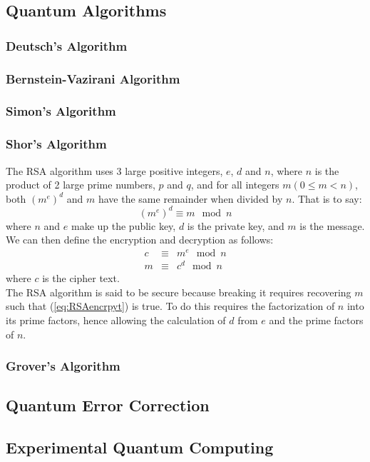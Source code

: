\documentclass{amsart}
\numberwithin{equation}{section}
\begin{document}
\subsection{Quantum Algorithms}
\subsubsection{Deutsch's Algorithm}
\subsubsection{Bernstein-Vazirani Algorithm}
\subsubsection{Simon's Algorithm}
\subsubsection{Shor's Algorithm} \label{sec:ShorsAlgorithm}
\begin{justify}
The RSA algorithm uses 3 large positive integers, $e$, $d$ and $n$, where $n$ is the product of 2 large prime numbers, $p$ and $q$, and for all integers $m(0 \leq m < n)$, both $(m^{e})^{d}$ and $m$ have the same remainder when divided by $n$. That is to say:
    \begin{equation}
        (m^{e})^{d} \equiv m \mod n
    \end{equation}
where $n$ and $e$ make up the public key, $d$ is the private key, and $m$ is the message. We can then define the encryption and decryption as follows: 
    \begin{eqnarray}
        c &\equiv& m^{e} \mod n \label{eq:RSAencrpyt} \\
        m &\equiv& c^{d} \mod n
    \end{eqnarray}
where $c$ is the cipher text. \\

The RSA algorithm is said to be secure because breaking it requires recovering $m$ such that (\ref{eq:RSAencrpyt}) is true. To do this requires the factorization of $n$ into its prime factors, hence allowing the calculation of $d$ from $e$ and the prime factors of $n$.
\end{justify}
\subsubsection{Grover's Algorithm} \label{sec:GroversAlgorithm}
\subsection{Quantum Error Correction}
\subsection{Experimental Quantum Computing}



\end{document}
